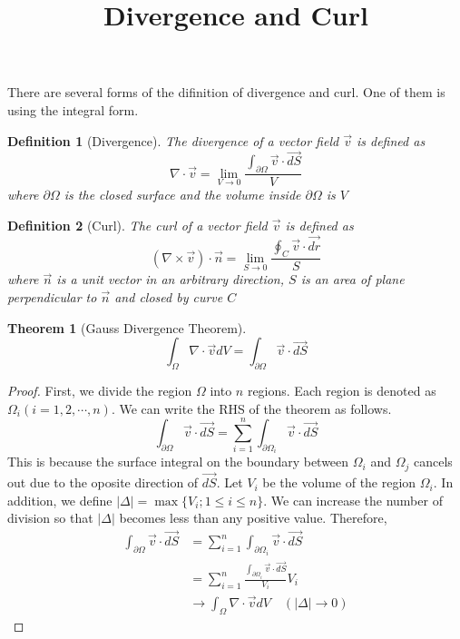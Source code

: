 \documentclass[letterpaper, 12pt]{article}
\title{Divergence and Curl}
\date{}
\theoremstyle{custom}
\newtheorem{definition}{Definition}
\newtheorem*{theorem}{Theorem}
\begin{document}
\maketitle
There are several forms of the difinition of divergence and curl. One of them is using the integral form.
\begin{definition}[Divergence]
  The divergence of a vector field $\vec{v}$ is defined as
  \begin{equation*}
    \nabla \cdot \vec{v} = \lim_{V \rightarrow 0} \frac{\displaystyle \int_{\partial \Omega} \vec{v} \cdot \vec{dS}}{V}
  \end{equation*}
  where $\partial \Omega$ is the closed surface and the volume inside $\partial \Omega$ is $V$
\end{definition}

\bigskip

\begin{definition}[Curl]
  The curl of a vector field $\vec{v}$ is defined as
  \begin{equation*}
    \left( \nabla \times \vec{v} \right) \cdot \vec{n} = \lim_{S \rightarrow 0} \frac{\displaystyle \oint_{C} \vec{v} \cdot \vec{dr}}{S}
  \end{equation*}
  where $\vec{n}$ is a unit vector in an arbitrary direction, $S$ is an area of plane perpendicular to $\vec{n}$ and closed by curve $C$
\end{definition}

\bigskip

\begin{theorem}[Gauss Divergence Theorem]
  \begin{equation*}
    \int_{\Omega} \nabla \cdot \vec{v} dV = \int_{\partial \Omega} \vec{v} \cdot \vec{dS}
  \end{equation*}
\end{theorem}
\begin{proof}
  First, we divide the region $\Omega$ into $n$ regions. Each region is denoted as $\Omega_i (i=1,2,\cdots , n)$.
  We can write the RHS of the theorem as follows.
  \begin{equation*}
    \int_{\partial \Omega} \vec{v} \cdot \vec{dS} = \sum_{i=1}^{n}\int_{\partial \Omega_i} \vec{v} \cdot \vec{dS}
  \end{equation*}
  This is because the surface integral on the boundary between $\Omega_i$ and $\Omega_j$ cancels out due to the oposite direction of $\vec{dS}$.
  Let $V_i$ be the volume of the region $\Omega_i$. In addition, we define $| \Delta |=\max \{ V_i;1 \leq i \leq n \}$.
  We can increase the number of division so that $| \Delta |$ becomes less than any positive value. Therefore,
  \begin{align*}
    \int_{\partial \Omega} \vec{v} \cdot \vec{dS} 
    &= \sum_{i=1}^{n}\int_{\partial \Omega_i} \vec{v} \cdot \vec{dS}\\
    &= \sum_{i=1}^{n}\frac{\displaystyle \int_{\partial \Omega_i} \vec{v} \cdot \vec{dS}}{V_i} V_i\\
    &\rightarrow \int_{\Omega} \nabla \cdot \vec{v} dV \quad (|\Delta| \rightarrow 0)
  \end{align*}
\end{proof}
\end{document}
